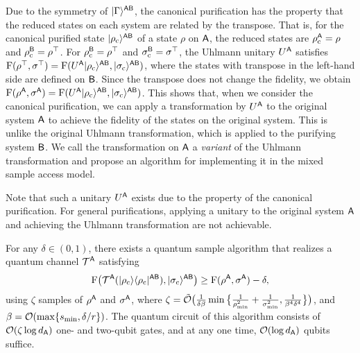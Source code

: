 Due to the symmetry of $|\Gamma\rangle^{{\mathsf{A}}{\mathsf{B}}}$, the canonical purification has the property that the reduced states on each system are related by the transpose. That is, for the canonical purified state $|\rho_{\rm c}\rangle^{{\mathsf{A}}{\mathsf{B}}}$ of a state $\rho$ on ${\mathsf{A}}$, the reduced states are $\rho_{\rm c}^{\mathsf{A}} = \rho$ and $\rho_{\rm c}^{\mathsf{B}} = \rho^\top$.
For $\rho_{\rm c}^{\mathsf{B}} = \rho^\top$ and $\sigma_{\rm c}^{\mathsf{B}} = \sigma^\top$, the Uhlmann unitary $U^{\mathsf{A}}$ satisfies ${\mathrm{F}}(\rho^\top, \sigma^\top) = {\mathrm{F}}(U^{\mathsf{A}}|\rho_{\rm c}\rangle^{{\mathsf{A}}{\mathsf{B}}}, |\sigma_{\rm c}\rangle^{{\mathsf{A}}{\mathsf{B}}})$, where the states with transpose in the left-hand side are defined on ${\mathsf{B}}$.
Since the transpose does not change the fidelity, we obtain ${\mathrm{F}}(\rho^{\mathsf{A}}, \sigma^{\mathsf{A}}) = {\mathrm{F}}(U^{\mathsf{A}}|\rho_{\rm c}\rangle^{{\mathsf{A}}{\mathsf{B}}}, |\sigma_{\rm c}\rangle^{{\mathsf{A}}{\mathsf{B}}})$.
This shows that, when we consider the canonical purification, we can apply a transformation by $U^{\mathsf{A}}$ to the original system ${\mathsf{A}}$ to achieve the fidelity of the states on the original system. 
This is unlike the original Uhlmann transformation, which is applied to the purifying system ${\mathsf{B}}$.
We call the transformation on ${\mathsf{A}}$ a \emph{variant} of the Uhlmann transformation and propose an algorithm for implementing it in the mixed sample access model.

Note that such a unitary $U^{\mathsf{A}}$ exists due to the property of the canonical purification.
For general purifications, applying a unitary to the original system ${\mathsf{A}}$ and achieving the Uhlmann transformation are not achievable.



\begin{theorem}
\label{thm:variant Uhl overview}
For any $\delta \in (0, 1)$, there exists a quantum sample algorithm that realizes a quantum channel ${\mathcal{T}}^{\mathsf{A}}$ satisfying 
\begin{align} 
    {\mathrm{F}}\big({\mathcal{T}}^{\mathsf{A}}(|\rho_{\rm c}\rangle\langle\rho_{\rm c}|^{{\mathsf{A}}{\mathsf{B}}}), |\sigma_{\rm c}\rangle^{{\mathsf{A}}{\mathsf{B}}}\big)  
    \geq {\mathrm{F}}(\rho^{\mathsf{A}}, \sigma^{\mathsf{A}}) - \delta, 
\end{align}
using $\zeta$ samples of $\rho^{\mathsf{A}}$ and $\sigma^{\mathsf{A}}$, where $\zeta = \tilde{{\mathcal{O}}}\big(\frac{1}{\delta\beta}\min\big\{\frac{1}{\rho_{\rm min}^2} + \frac{1}{\sigma_{\rm min}^2}, \frac{1}{\beta^4\delta^4}\big\}\big)$, and $\beta = {\mathcal{O}}(\max\{s_{\rm min}, \delta/r\})$.
The quantum circuit of this algorithm consists of ${\mathcal{O}}(\zeta\log{d_{\mathsf{A}}})$ one- and two-qubit gates, and at any one time, ${\mathcal{O}}(\log{d_{\mathsf{A}}})$ qubits suffice.
\end{theorem}


